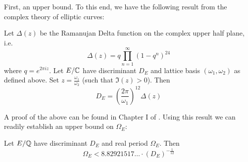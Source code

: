 First, an upper bound. To this end, we have the following result from the complex theory of elliptic curves:
\begin{proposition}
Let $\Delta(z)$ be the Ramanujan Delta function on the complex upper half plane, i.e.
\begin{equation}
\Delta(z) = q \prod_{n=1}^{\infty} (1-q^n)^{24}
\end{equation}
where $q = e^{2\pi i z}$. Let $E/\mathbb{C}$ have discriminant $D_E$ and lattice basis $(\omega_1,\omega_2)$ as defined above. Set $z = \frac{\omega_1}{\omega_2}$ (such that $\Im(z) > 0$). Then
\begin{equation}\label{eqn:modular_discriminant}
D_E = \left(\frac{2\pi}{\omega_1}\right)^{12} \Delta\left(z \right)
\end{equation}
\end{proposition}
A proof of the above can be found in Chapter I of \cite{Sil-1994}. Using this result we can readily establish an upper bound on $\Omega_E$:
\begin{proposition}\label{prop:real_period_upper_bound_discriminant}
Let $E/\mathbb{Q}$ have discriminant $D_E$ and real period $\Omega_E$. Then
\begin{equation}\label{eqn:real_period_upper_bound_discriminant}
\Omega_E < 8.82921517\ldots \cdot (D_E)^{-\frac{1}{12}}
\end{equation}
\end{proposition}
